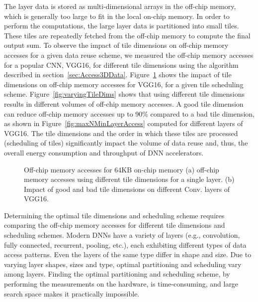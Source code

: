 The layer data is stored as multi-dimensional arrays in the off-chip memory, which is generally too large to fit in the local on-chip memory. In order to perform the computations, the large layer data is partitioned into small tiles. These tiles are repeatedly fetched from the off-chip memory to compute the final output sum. To observe the impact of tile dimensions on off-chip memory accesses for a given data reuse scheme, we measured the off-chip memory accesses for a popular CNN, VGG16, for different tile dimensions using the algorithm described in section~\ref{sec:Access3DData}. Figure~\ref{fig:impactOfTileDims} shows the impact of tile dimensions on off-chip memory accesses for VGG16, for a given tile scheduling scheme. Figure~\ref{fig:varyingTileDims} shows that using different tile dimensions results in different volumes of off-chip memory accesses. A good tile dimension can reduce off-chip memory accesses up to 90\% compared to a bad tile dimension, as shown in Figure~\ref{fig:maxNMinLayerAccess} computed for different layers of VGG16. The tile dimensions and the order in which these tiles are processed (scheduling of tiles) significantly impact the volume of data reuse and, thus, the overall energy consumption and throughput of DNN accelerators.
\begin{figure}[!h]
	\centering
	\captionsetup{font=sf}
	\hfil	
	\hfil	
	\caption{Off-chip memory accesses for 64KB on-chip memory (a) off-chip memory accesses using different tile dimensions for a single layer. (b) Impact of good and bad tile dimensions on different Conv. layers of VGG16.}
	\label{fig:impactOfTileDims}
\end{figure}

Determining the optimal tile dimensions and scheduling scheme requires comparing the off-chip memory accesses for different tile dimensions and scheduling schemes. Modern DNNs have a variety of layers (e.g., convolution, fully connected, recurrent, pooling, etc.), each exhibiting different types of data access patterns. Even the layers of the same type differ in shape and size. Due to varying layer shapes, sizes and type, optimal partitioning and scheduling vary among layers. Finding the optimal partitioning and scheduling scheme, by performing the measurements on the hardware, is time-consuming, and large search space makes it practically impossible.

